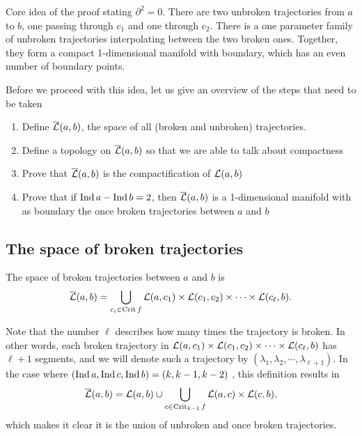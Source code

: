 \begin{marginfigure}
    \centering
    \caption{
        Core idea of the proof stating $\partial^2 = 0$.
        There are two unbroken trajectories from $a$ to $b$, one passing through $c_1$ and one through $c_2$.
        There is a one parameter family of unbroken trajectories interpolating between the two broken ones.
        Together, they form a compact 1-dimensional manifold with boundary, which has an even number of boundary points.
    }
    \label{fig:morse-complex-is-a-complex-idea-of-proof}
\end{marginfigure}

Before we proceed with this idea, let us give an overview of the steps that need to be taken

\begin{enumerate}
    \item Define $\overline{\mathcal L}(a, b)$, the space of all (broken and unbroken) trajectories.
    \item Define a topology on $\overline{\mathcal L}(a, b)$ so that we are able to talk about compactness
    \item Prove that  $\overline{\mathcal L}(a, b)$ is the compactification of $\mathcal L(a, b)$
    \item Prove that if $\operatorname{Ind} a - \operatorname{Ind} b = 2$, then $\overline{\mathcal L}(a, b)$ is a 1-dimensional manifold with as boundary the once broken trajectories between $a$ and  $b$
\end{enumerate}

\subsection{The space of broken trajectories}
\begin{definition}
    The space of broken trajectories between $a$ and  $b$ is
     \[
         \overline{\mathcal L}(a, b) = \bigcup_{c_i \in \operatorname{Crit} f} \mathcal L(a, c_1) \times \mathcal L(c_1, c_2) \times  \cdots \times \mathcal L(c_\ell, b)
    .\] 
\end{definition}

    Note that the number $\ell$ describes how many times the trajectory is broken.
    In other words, each broken trajectory in $\mathcal L(a, c_1) \times \mathcal L(c_1, c_2) \times  \cdots \times \mathcal L(c_\ell, b)$ has $ \ell+1$ segments,  and we will denote such a trajectory by $(\lambda_1, \lambda_2, \cdots, \lambda_{\ell+1})$.
    In the case where $(\operatorname{Ind} a, \operatorname{Ind} c, \operatorname{Ind} b) = (k, k-1, k-2)$ , this definition results in
    \[
        \overline{\mathcal L}(a, b) = \mathcal L(a, b) \cup  \bigcup_{c \in \operatorname{Crit}_{k-1} f}  \mathcal L(a, c) \times \mathcal L(c, b)
    ,\] 
    which makes it clear it is the union of unbroken and once broken trajectories.

